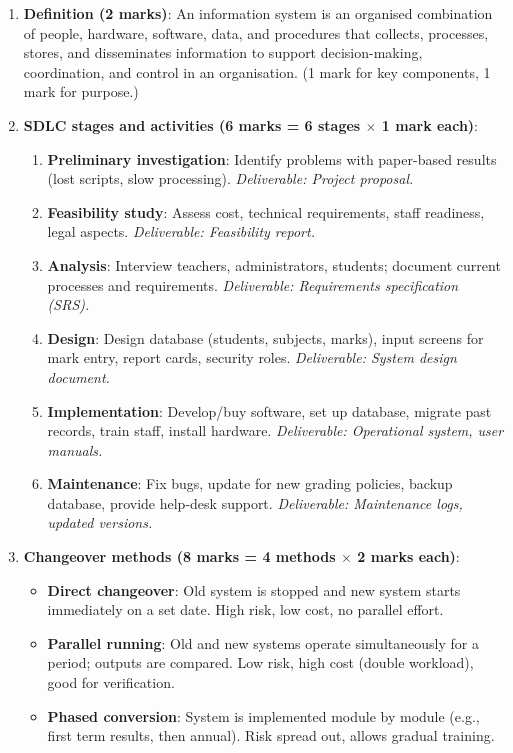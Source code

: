 \documentclass[11pt]{article}
\begin{document}
\begin{corrige}
\begin{enumerate}
\item \textbf{Definition (2 marks)}: An information system is an organised combination of people, hardware, software, data, and procedures that collects, processes, stores, and disseminates information to support decision-making, coordination, and control in an organisation. (1 mark for key components, 1 mark for purpose.)
\item \textbf{SDLC stages and activities (6 marks = 6 stages $\times$ 1 mark each)}:
\begin{enumerate}
\item \textbf{Preliminary investigation}: Identify problems with paper-based results (lost scripts, slow processing). \textit{Deliverable: Project proposal.}
\item \textbf{Feasibility study}: Assess cost, technical requirements, staff readiness, legal aspects. \textit{Deliverable: Feasibility report.}
\item \textbf{Analysis}: Interview teachers, administrators, students; document current processes and requirements. \textit{Deliverable: Requirements specification (SRS).}
\item \textbf{Design}: Design database (students, subjects, marks), input screens for mark entry, report cards, security roles. \textit{Deliverable: System design document.}
\item \textbf{Implementation}: Develop/buy software, set up database, migrate past records, train staff, install hardware. \textit{Deliverable: Operational system, user manuals.}
\item \textbf{Maintenance}: Fix bugs, update for new grading policies, backup database, provide help-desk support. \textit{Deliverable: Maintenance logs, updated versions.}
\end{enumerate}
\item \textbf{Changeover methods (8 marks = 4 methods $\times$ 2 marks each)}:
\begin{itemize}
\item \textbf{Direct changeover}: Old system is stopped and new system starts immediately on a set date. High risk, low cost, no parallel effort.
\item \textbf{Parallel running}: Old and new systems operate simultaneously for a period; outputs are compared. Low risk, high cost (double workload), good for verification.
\item \textbf{Phased conversion}: System is implemented module by module (e.g., first term results, then annual). Risk spread out, allows gradual training.

\end{itemize}
\end{enumerate}
\end{corrige}
\end{document}

